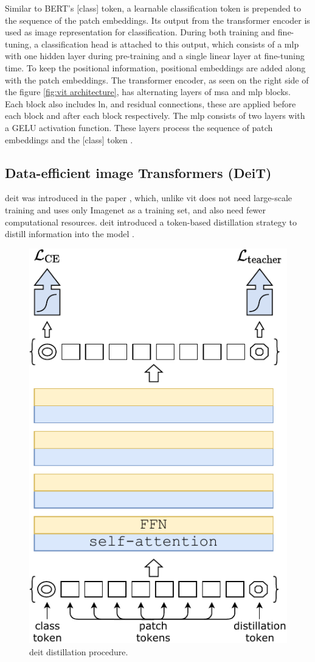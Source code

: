 Similar to BERT's [class] token, a learnable classification token is prepended to the sequence of the patch embeddings. Its output from the transformer encoder is used as image representation for classification. During both training and fine-tuning, a classification head is attached to this output, which consists of a \gls{mlp} with one hidden layer during pre-training and a single linear layer at fine-tuning time. To keep the positional information, positional embeddings are added along with the patch embeddings. The transformer encoder, as seen on the right side of the figure \ref{fig:vit architecture}, has alternating layers of \gls{msa} and \gls{mlp} blocks. Each block also includes \gls{ln}, and residual connections, these are applied before each block and after each block respectively. The \gls{mlp} consists of two layers with a GELU activation function. These layers process the sequence of patch embeddings and the [class] token \cite{dosovitskiy2020image}.

\subsection{Data-efficient image Transformers (DeiT)}

\gls{deit} was introduced in the paper \cite{pmlr-v139-touvron21a}, which, unlike \gls{vit}\cite{dosovitskiy2020image} does not need large-scale training and uses only Imagenet as a training set, and also need fewer computational resources. \gls{deit} introduced a token-based distillation strategy to distill information into the model \cite{pmlr-v139-touvron21a}.

\begin{figure}[ht!]
    \centering
    \includegraphics[width=0.5\linewidth]{Rohit_Master_Thesis//Images/deit_distillation_token.pdf}
    \caption{\gls{deit} distillation procedure\cite{pmlr-v139-touvron21a}.}
    \label{fig:deit distillation token}
\end{figure}

